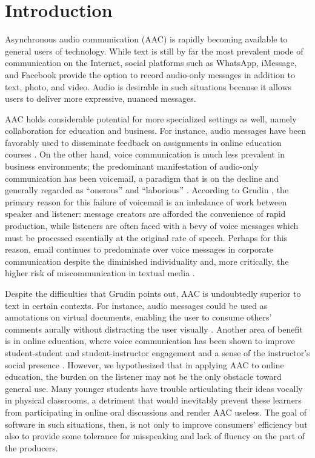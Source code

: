 \section{Introduction}

Asynchronous audio communication (AAC) is rapidly becoming available to general users of technology. 
While text is still by far the most prevalent mode of communication on the Internet, social platforms such as WhatsApp, iMessage, and Facebook provide the option to record audio-only messages in addition to text, photo, and video. 
Audio is desirable in such situations because it allows users to deliver more expressive, nuanced messages.

AAC holds considerable potential for more specialized settings as well, namely collaboration for education and business. 
For instance, audio messages have been favorably used to disseminate feedback on assignments in online education courses \cite{ice,oomen}. 
On the other hand, voice communication is much less prevalent in business environments; the predominant manifestation of audio-only communication has been voicemail, a paradigm that is on the decline and generally regarded as ``onerous'' and ``laborious'' \cite{whittaker}. 
According to Grudin \cite{grudin}, the primary reason for this failure of voicemail is an imbalance of work between speaker and listener: message creators are afforded the convenience of rapid production, while listeners are often faced with a bevy of voice messages which must be processed essentially at the original rate of speech. 
Perhaps for this reason, email continues to predominate over voice messages in corporate communication despite the diminished individuality and, more critically, the higher risk of miscommunication in textual media \cite{byron}.

Despite the difficulties that Grudin points out, AAC is undoubtedly superior to text in certain contexts. 
For instance, audio messages could be used as annotations on virtual documents, enabling the user to consume others' comments aurally without distracting the user visually \cite{yoon}.
Another area of benefit is in online education, where voice communication has been shown to improve student-student and student-instructor engagement and a sense of the instructor's social presence \cite{oomen,tu}. 
However, we hypothesized that in applying AAC to online education, the burden on the listener may not be the only obstacle toward general use. 
Many younger students have trouble articulating their ideas vocally in physical classrooms, a detriment that would inevitably prevent these learners from participating in online oral discussions and render AAC useless.
The goal of software in such situations, then, is not only to improve consumers' efficiency but also to provide some tolerance for misspeaking and lack of fluency on the part of the producers.

